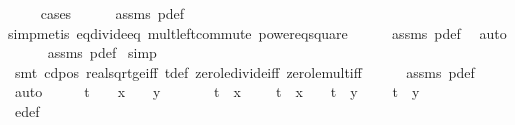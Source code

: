 \begin{isabellebody}
\ \ \ \ \isamarkupfalse%
{\isacharparenleft}cases{\isacharparenright}\isanewline
\ \ \ \ \isamarkupfalse%
\ assms{\isacharparenleft}{}{\isacharparenright}\ p{\isacharunderscore}def\ \isanewline
\ \ \ \ \isamarkupfalse%
{\isacharparenleft}simp{\isacharcomma}metis\ eq{\isacharunderscore}divide{\isacharunderscore}eq\ mult{\isachardot}left{\isacharunderscore}commute\ power{}{\isacharunderscore}eq{\isacharunderscore}square{\isacharparenright}\isanewline
\ \ \ \ \isamarkupfalse%
\ assms{\isacharparenleft}{}{\isacharparenright}\ p{\isacharunderscore}def\ \isamarkupfalse%
\ auto{\isacharbrackleft}{}{\isacharbrackright}\isanewline
\ \ \ \ \isamarkupfalse%
\ assms{\isacharparenleft}{}{\isacharparenright}\ p{\isacharunderscore}def\ \isamarkupfalse%
{\isacharparenleft}simp{\isacharparenright}\isanewline
\ \ \ \ \isamarkupfalse%
\ {\isacharparenleft}smt\ c{\isacharunderscore}d{\isacharunderscore}pos\ real{\isacharunderscore}sqrt{\isacharunderscore}ge{\isacharunderscore}{}{\isacharunderscore}iff\ t{\isacharunderscore}def\ zero{\isacharunderscore}le{\isacharunderscore}divide{\isacharunderscore}{}{\isacharunderscore}iff\ zero{\isacharunderscore}le{\isacharunderscore}mult{\isacharunderscore}iff{\isacharparenright}\isanewline
\ \ \ \ \isamarkupfalse%
\ assms{\isacharparenleft}{}{\isacharparenright}\ p{\isacharunderscore}def\ \isamarkupfalse%
\ auto{\isacharbrackleft}{}{\isacharbrackright}\isanewline
\ \ \isamarkupfalse%
\ \isamarkupfalse%
\ {\isachardoublequoteopen}t\ {\isacharequal}\ {}\ {\isasymor}\ x\ {\isacharequal}\ {}\ {\isasymor}\ y\ {\isacharequal}\ {}\ {\isasymor}\isanewline
\ \ \ \ {\isacharparenleft}t\ {\isacharasterisk}\ x\ {\isacharequal}\ {\isacharminus}\ {}\ {\isasymor}\ t\ {\isacharasterisk}\ x\ {\isacharequal}\ {}{\isacharparenright}\ {\isasymand}\ {\isacharparenleft}t\ {\isacharasterisk}\ y\ {\isacharequal}\ {\isacharminus}\ {}\ {\isasymor}\ t\ {\isacharasterisk}\ y\ {\isacharequal}\ {}{\isacharparenright}{\isachardoublequoteclose}\ \isanewline
\ \ \ \ \isamarkupfalse%
\ e{\isacharprime}{\isacharunderscore}def\ \isamarkupfalse%

\end{isabellebody}
